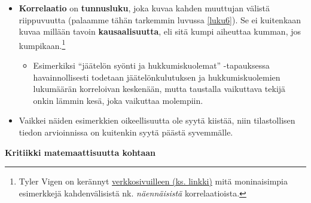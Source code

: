 \documentclass[
]{book}
\providecommand{\tightlist}{%
  \setlength{\itemsep}{0pt}\setlength{\parskip}{0pt}}
\begin{document}
\begin{itemize}
\tightlist
\item
  \textbf{Korrelaatio} on \textbf{tunnusluku}, joka kuvaa kahden muuttujan välistä riippuvuutta (palaamme tähän tarkemmin luvussa \ref{luku6}). Se ei kuitenkaan kuvaa millään tavoin \textbf{kausaalisuutta}, eli sitä kumpi aiheuttaa kumman, jos kumpikaan.\footnote{Tyler Vigen on kerännyt \href{https://www.tylervigen.com/spurious-correlations}{verkkosivuilleen (ks. linkki)} mitä moninaisimpia esimerkkejä kahdenvälisistä nk. \emph{näennäisistä} korrelaatioista.}

  \begin{itemize}
  \tightlist
  \item
    Esimerkiksi ``jäätelön syönti ja hukkumiskuolemat'' -tapauksessa havainnollisesti todetaan jäätelönkulutuksen ja hukkumiskuolemien lukumäärän korreloivan keskenään, mutta taustalla vaikuttava tekijä onkin lämmin kesä, joka vaikuttaa molempiin.
  \end{itemize}
\item
  Vaikkei näiden esimerkkien oikeellisuutta ole syytä kiistää, niin tilastollisen tiedon arvioinnissa on kuitenkin syytä päästä syvemmälle.
\end{itemize}

\hfill\break
\hfill\break

\textbf{Kritiikki matemaattisuutta kohtaan}
\end{document}
